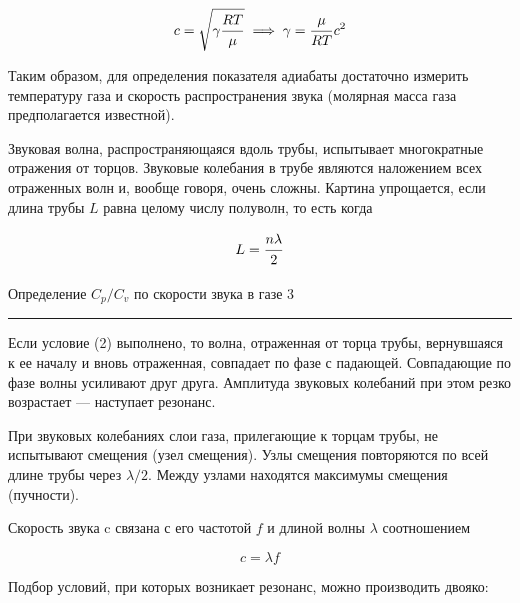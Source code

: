 \documentclass[12pt,a4paper]{scrartcl}
\begin{document}
	\begin{equation}
		c = \sqrt{\gamma \dfrac{\strut RT}{\strut \mu}} \implies \gamma = \dfrac{\strut \mu}{\strut RT}c^2
	\end{equation}

	Таким образом, для определения показателя адиабаты достаточно измерить температуру газа и скорость распространения звука (молярная масса газа предполагается известной).
	
	
	Звуковая волна, распространяющаяся вдоль трубы, испытывает многократные отражения от торцов. Звуковые колебания в трубе являются наложением всех отраженных волн и, вообще говоря, очень сложны. Картина упрощается, если длина трубы $L$ равна целому числу полуволн, то есть когда
	
	\begin{equation}
		L = \dfrac{\strut n\lambda}{\strut 2}
	\end{equation}
	
	\newpage 
	
	
	\begin{flushleft}
		\footnotesize{Определение $C_p /C_v$ по скорости звука в газе} \hspace{\fill} \footnotesize{3}
		\\[-0.3cm]\noindent\rule{\textwidth}{0.3pt}
	\end{flushleft}
	
	Если условие (2) выполнено, то волна, отраженная от торца трубы, вернувшаяся к ее началу и вновь отраженная, совпадает по фазе с падающей. Совпадающие по фазе волны усиливают друг друга. Амплитуда звуковых колебаний при этом резко возрастает — наступает резонанс.
	
	При звуковых колебаниях слои газа, прилегающие к торцам трубы, не испытывают смещения (узел смещения). Узлы смещения повторяются по всей длине трубы через $\lambda/2$. Между узлами находятся максимумы смещения (пучности).
	
	Скорость звука c связана с его частотой $f$ и длиной волны $\lambda$ соотношением
	
	\begin{equation}
		c = \lambda f
	\end{equation}
	
	Подбор условий, при которых возникает резонанс, можно производить двояко:
	
\end{document}
